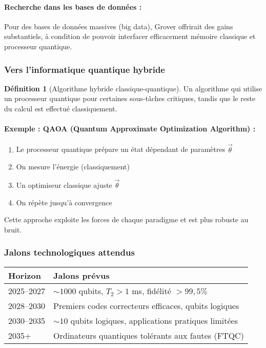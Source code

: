 \documentclass[12pt,a4paper]{article}
\theoremstyle{definition}
\newtheorem{definition}[theorem]{Définition}
\theoremstyle{remark}
\begin{document}
\paragraph{Recherche dans les bases de données :}
Pour des bases de données massives (big data), Grover offrirait des gains substantiels, à condition de pouvoir interfacer efficacement mémoire classique et processeur quantique.

\subsubsection{Vers l'informatique quantique hybride}

\begin{definition}[Algorithme hybride classique-quantique]
Un algorithme qui utilise un processeur quantique pour certaines sous-tâches critiques, tandis que le reste du calcul est effectué classiquement.
\end{definition}

\paragraph{Exemple : QAOA (Quantum Approximate Optimization Algorithm) :}
\begin{enumerate}
    \item Le processeur quantique prépare un état dépendant de paramètres $\vec{\theta}$
    \item On mesure l'énergie (classiquement)
    \item Un optimiseur classique ajuste $\vec{\theta}$
    \item On répète jusqu'à convergence
\end{enumerate}

Cette approche exploite les forces de chaque paradigme et est plus robuste au bruit.

\subsubsection{Jalons technologiques attendus}

\begin{center}
\begin{tabular}{|l|l|}
\hline
\textbf{Horizon} & \textbf{Jalons prévus} \\
\hline
2025--2027 & $\sim 1000$ qubits, $T_2 > 1$ ms, fidélité $> 99{,}5\%$ \\
2028--2030 & Premiers codes correcteurs efficaces, qubits logiques \\
2030--2035 & $\sim 10$ qubits logiques, applications pratiques limitées \\
2035+ & Ordinateurs quantiques tolérants aux fautes (FTQC) \\
\hline
\end{tabular}
\end{center}
\end{document}
